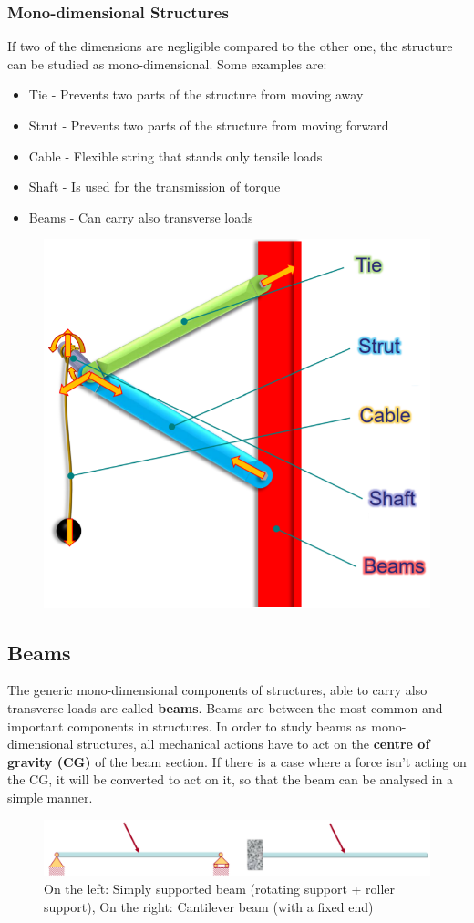 \documentclass[class=report, crop=false, 12pt,a4paper]{standalone}
\begin{document}
\subsubsection{Mono-dimensional Structures}
If two of the dimensions are negligible compared to the other one, the structure can be studied as mono-dimensional. Some examples are:
\begin{itemize}[noitemsep]
  \item Tie - Prevents two parts of the structure from moving away
  \item Strut - Prevents two parts of the structure from moving forward
  \item Cable - Flexible string that stands only tensile loads
  \item Shaft - Is used for the transmission of torque
  \item Beams - Can carry also transverse loads
\end{itemize}
\begin{figure}[H]
  \centering
  \includegraphics[width = 0.45 \textwidth]{../img/monodimensionalstructures.PNG}
\end{figure}
\subsection{Beams}
The generic mono-dimensional components of structures, able to carry also transverse loads are called \textbf{beams}. Beams are between the most common and important components in structures. In order to study beams as mono-dimensional structures, all mechanical actions have to act on the \textbf{centre of gravity (CG)} of the beam section. If there is a case where a force isn't acting on the CG, it will be converted to act on it, so that the beam can be analysed in a simple manner.
\begin{figure}[H]
  \centering
  \includegraphics[width = 1 \textwidth]{../img/beamexamples.PNG}
  \caption{On the left: Simply supported beam (rotating support + roller support), On the right: Cantilever beam (with a fixed end)}
\end{figure}
\end{document}
